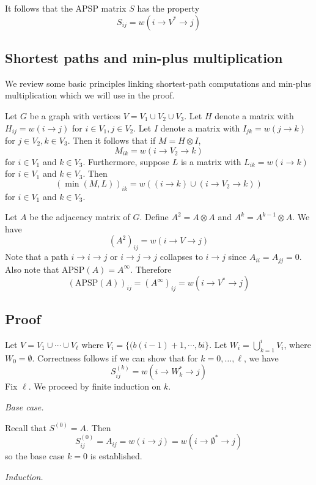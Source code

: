 \documentclass{article} %
\begin{document}
It follows that the APSP matrix $S$ has the property
\[
S_{ij} = w(i \to V^* \to j)
\]

\subsection{Shortest paths and min-plus multiplication}

We review some basic principles linking shortest-path computations and min-plus multiplication which we will use in the proof.

Let $G$ be a graph with vertices $V = V_1 \cup V_2 \cup V_3$.
Let $H$ denote a matrix with $H_{ij} = w(i \to j)$ for $i \in V_1, j \in V_2$.
Let $I$ denote a matrix with $I_{jk} = w(j \to k)$ for $j \in V_2, k \in V_3$.
Then it follows that if $M = H \otimes I$,
\[
M_{ik} = w(i \to V_2 \to k)
\]
for $i \in V_1$ and $k \in V_3$.
Furthermore, suppose $L$ is a matrix with $L_{ik} = w(i \to k)$ for $i \in V_1$ and $k \in V_3$.
Then
\[
(\min(M, L))_{ik} = w((i \to k) \cup (i \to V_2 \to k))
\]
for $i \in V_1$ and $k \in V_3$.

Let $A$ be the adjacency matrix of $G$.
Define $A^2 = A \otimes A$ and $A^k = A^{k-1} \otimes A$.
We have
\[
(A^2)_{ij} = w(i \to V \to j)
\]
Note that a path $i \to i \to j$ or $i \to j \to j$ collapses to $i \to j$
since $A_{ii} = A_{jj} = 0$.
Also note that $\text{APSP}(A) = A^\infty$.
Therefore
\[
(\text{APSP}(A))_{ij} = (A^\infty)_{ij} = w(i \to V^* \to j)
\]


\subsection{Proof}

Let $V = V_1 \cup \cdots \cup V_\ell$ where $V_i = \{(b(i-1) + 1, \cdots, bi\}$.
Let $W_i = \bigcup_{k=1}^i V_i$, where $W_0 = \emptyset$.
Correctness follows if we can show that for $k = 0,\hdots, \ell$, we have
\[
S^{(k)}_{ij} = w(i \to W_k^* \to j)
\]
Fix $\ell$. We proceed by finite induction on $k$.

\emph{Base case.}

Recall that $S^{(0)} = A$.
Then
\[
S^{(0)}_{ij} = A_{ij} = w(i \to j) = w(i \to \emptyset^* \to j)
\]
so the base case $k=0$ is established.


\emph{Induction.}
\end{document}

